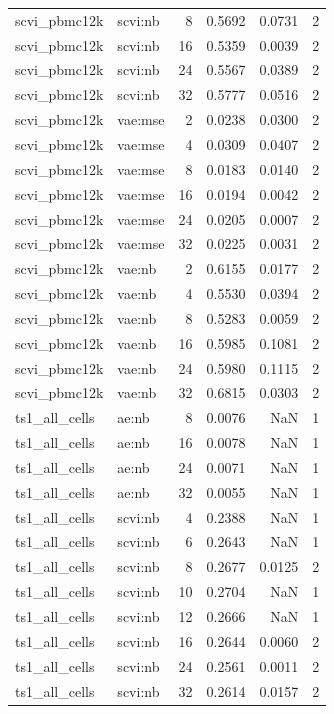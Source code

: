 \begin{tabular}{llrrrr}
scvi\_pbmc12k & scvi:nb & 8 & 0.5692 & 0.0731 & 2 \\
scvi\_pbmc12k & scvi:nb & 16 & 0.5359 & 0.0039 & 2 \\
scvi\_pbmc12k & scvi:nb & 24 & 0.5567 & 0.0389 & 2 \\
scvi\_pbmc12k & scvi:nb & 32 & 0.5777 & 0.0516 & 2 \\
scvi\_pbmc12k & vae:mse & 2 & 0.0238 & 0.0300 & 2 \\
scvi\_pbmc12k & vae:mse & 4 & 0.0309 & 0.0407 & 2 \\
scvi\_pbmc12k & vae:mse & 8 & 0.0183 & 0.0140 & 2 \\
scvi\_pbmc12k & vae:mse & 16 & 0.0194 & 0.0042 & 2 \\
scvi\_pbmc12k & vae:mse & 24 & 0.0205 & 0.0007 & 2 \\
scvi\_pbmc12k & vae:mse & 32 & 0.0225 & 0.0031 & 2 \\
scvi\_pbmc12k & vae:nb & 2 & 0.6155 & 0.0177 & 2 \\
scvi\_pbmc12k & vae:nb & 4 & 0.5530 & 0.0394 & 2 \\
scvi\_pbmc12k & vae:nb & 8 & 0.5283 & 0.0059 & 2 \\
scvi\_pbmc12k & vae:nb & 16 & 0.5985 & 0.1081 & 2 \\
scvi\_pbmc12k & vae:nb & 24 & 0.5980 & 0.1115 & 2 \\
scvi\_pbmc12k & vae:nb & 32 & 0.6815 & 0.0303 & 2 \\
ts1\_all\_cells & ae:nb & 8 & 0.0076 & NaN & 1 \\
ts1\_all\_cells & ae:nb & 16 & 0.0078 & NaN & 1 \\
ts1\_all\_cells & ae:nb & 24 & 0.0071 & NaN & 1 \\
ts1\_all\_cells & ae:nb & 32 & 0.0055 & NaN & 1 \\
ts1\_all\_cells & scvi:nb & 4 & 0.2388 & NaN & 1 \\
ts1\_all\_cells & scvi:nb & 6 & 0.2643 & NaN & 1 \\
ts1\_all\_cells & scvi:nb & 8 & 0.2677 & 0.0125 & 2 \\
ts1\_all\_cells & scvi:nb & 10 & 0.2704 & NaN & 1 \\
ts1\_all\_cells & scvi:nb & 12 & 0.2666 & NaN & 1 \\
ts1\_all\_cells & scvi:nb & 16 & 0.2644 & 0.0060 & 2 \\
ts1\_all\_cells & scvi:nb & 24 & 0.2561 & 0.0011 & 2 \\
ts1\_all\_cells & scvi:nb & 32 & 0.2614 & 0.0157 & 2 \\

\end{tabular}
